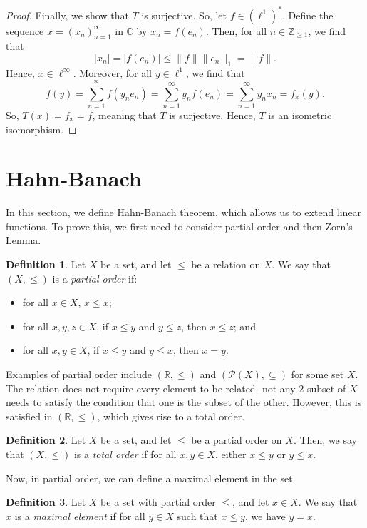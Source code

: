 \documentclass[a4paper, openany]{memoir}
\theoremstyle{definition}
\newtheorem{definition}{Definition}[section]
\theoremstyle{plain}
\begin{document}
\begin{proof}
        Finally, we show that $T$ is surjective. So, let $f \in (\ell^1)^*$. Define the sequence $x = (x_n)_{n=1}^\infty$ in $\mathbb{C}$ by $x_n = f(e_n)$. Then, for all $n \in \mathbb{Z}_{\geq 1}$, we find that 
        \[|x_n| = |f(e_n)| \leq \lVert f \rVert \lVert e_n \rVert_1 = \lVert f \rVert.\]
        Hence, $x \in \ell^\infty$. Moreover, for all $y \in \ell^1$, we find that
        \[f(y) = \sum_{n=1}^{^\infty} f(y_n e_n) = \sum_{n=1}^{\infty} y_n f(e_n) = \sum_{n=1}^{\infty} y_n x_n = f_x(y).\]
        So, $T(x) = f_x = f$, meaning that $T$ is surjective. Hence, $T$ is an isometric isomorphism.
    \end{proof}
    \newpage

    \section{Hahn-Banach}
    In this section, we define Hahn-Banach theorem, which allows us to extend linear functions. To prove this, we first need to consider partial order and then Zorn's Lemma.
    \begin{definition}
        Let $X$ be a set, and let $\leq$ be a relation on $X$. We say that $(X, \leq)$ is a \emph{partial order} if:
        \begin{itemize}
            \item for all $x \in X$, $x \leq x$;
            \item for all $x, y, z \in X$, if $x \leq y$ and $y \leq z$, then $x \leq z$; and
            \item for all $x, y \in X$, if $x \leq y$ and $y \leq x$, then $x = y$.
        \end{itemize}
    \end{definition}
    \noindent Examples of partial order include $(\mathbb{R}, \leq)$ and $(\mathcal{P}(X), \subseteq)$ for some set $X$. The relation does not require every element to be related- not any 2 subset of $X$ needs to satisfy the condition that one is the subset of the other. However, this is satisfied in $(\mathbb{R}, \leq)$, which gives rise to a total order.
    \begin{definition}
        Let $X$ be a set, and let $\leq$ be a partial order on $X$. Then, we say that $(X, \leq)$ is a \emph{total order} if for all $x, y \in X$, either $x \leq y$ or $y \leq x$.
    \end{definition}
    \noindent Now, in partial order, we can define a maximal element in the set.
    \begin{definition}
        Let $X$ be a set with partial order $\leq$, and let $x \in X$. We say that $x$ is a \emph{maximal element} if for all $y \in X$ such that $x \leq y$, we have $y = x$.
    \end{definition}
\end{document}
